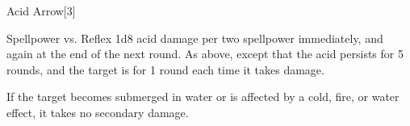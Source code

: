 \begin{spellsection}{Acid Arrow}[3]
    \begin{spellheader}
    \end{spellheader}
    \begin{spellcontent}
        \begin{spelltargetinginfo}
        \end{spelltargetinginfo}
        \begin{spelleffects}
            \begin{spellattack}{Spellpower vs. Reflex}
                \spellsuccess 1d8 acid damage per two spellpower immediately, and again at the end of the next round.
                \spellcritical As above, except that the acid persists for 5 rounds, and the target is \sickened for 1 round each time it takes damage.
            \end{spellattack}
        \end{spelleffects}
    \end{spellcontent}
    \begin{spellfooter}
        \spellnotes If the target becomes submerged in water or is affected by a cold, fire, or water effect, it takes no secondary damage.

        \physicalspellnotes
        \miscastrandom
    \end{spellfooter}
    \begin{spellaugments}
    \end{spellaugments}
\end{spellsection}

